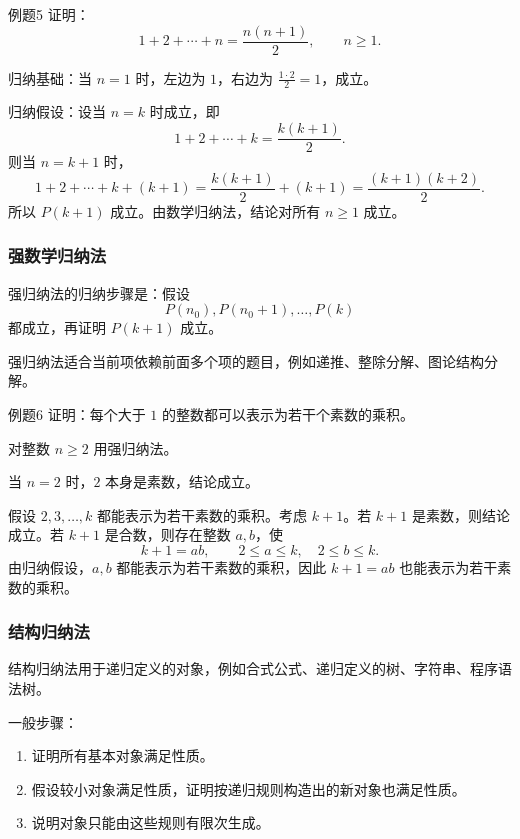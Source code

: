 \begin{question}{例题5}
	证明：
	\[
	1+2+\cdots+n=\frac{n(n+1)}2,\qquad n\ge1.
	\]
	
	\begin{solution}
	归纳基础：当 \(n=1\) 时，左边为 \(1\)，右边为 \(\frac{1\cdot2}{2}=1\)，成立。
	
	归纳假设：设当 \(n=k\) 时成立，即
	\[
	1+2+\cdots+k=\frac{k(k+1)}2.
	\]
	则当 \(n=k+1\) 时，
	\[
	1+2+\cdots+k+(k+1)
	=\frac{k(k+1)}2+(k+1)
	=\frac{(k+1)(k+2)}2.
	\]
	所以 \(P(k+1)\) 成立。由数学归纳法，结论对所有 \(n\ge1\) 成立。
	\end{solution}
\end{question}

\subsubsection{强数学归纳法}

强归纳法的归纳步骤是：假设
\[
P(n_0),P(n_0+1),\dots,P(k)
\]
都成立，再证明 \(P(k+1)\) 成立。

强归纳法适合当前项依赖前面多个项的题目，例如递推、整除分解、图论结构分解。

\begin{question}{例题6}
	证明：每个大于 \(1\) 的整数都可以表示为若干个素数的乘积。
	
	\begin{solution}
	对整数 \(n\ge2\) 用强归纳法。
	
	当 \(n=2\) 时，\(2\) 本身是素数，结论成立。
	
	假设 \(2,3,\dots,k\) 都能表示为若干素数的乘积。考虑 \(k+1\)。若 \(k+1\) 是素数，则结论成立。若 \(k+1\) 是合数，则存在整数 \(a,b\)，使
	\[
	k+1=ab,\qquad 2\le a\le k,\quad 2\le b\le k.
	\]
	由归纳假设，\(a,b\) 都能表示为若干素数的乘积，因此 \(k+1=ab\) 也能表示为若干素数的乘积。
	\end{solution}
\end{question}

\subsubsection{结构归纳法}

结构归纳法用于递归定义的对象，例如合式公式、递归定义的树、字符串、程序语法树。

一般步骤：
\begin{enumerate}
	\item 证明所有基本对象满足性质。
	\item 假设较小对象满足性质，证明按递归规则构造出的新对象也满足性质。
	\item 说明对象只能由这些规则有限次生成。
\end{enumerate}

